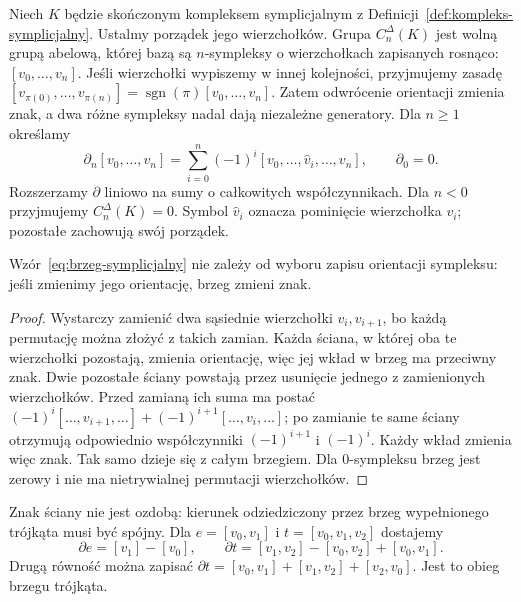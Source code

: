 \begin{definicja}
\label{def:homologia-symplicjalna}
Niech $K$ będzie skończonym kompleksem symplicjalnym
z Definicji~\ref{def:kompleks-symplicjalny}.
Ustalmy porządek jego wierzchołków. Grupa
$C_n^\Delta(K)$ jest wolną grupą abelową, której bazą są
$n$-sympleksy o wierzchołkach zapisanych rosnąco:
$[v_0,\ldots,v_n]$. Jeśli wierzchołki wypiszemy
w innej kolejności, przyjmujemy zasadę
$[v_{\pi(0)},\ldots,v_{\pi(n)}]
=\operatorname{sgn}(\pi)[v_0,\ldots,v_n]$.
Zatem odwrócenie orientacji zmienia znak, a dwa
różne sympleksy nadal dają niezależne generatory.
Dla $n\geq1$ określamy
\begin{equation}\label{eq:brzeg-symplicjalny}
 \partial_n[v_0,\ldots,v_n]
 =\sum_{i=0}^n(-1)^i
 [v_0,\ldots,\widehat v_i,\ldots,v_n],
 \qquad \partial_0=0.
\end{equation}
Rozszerzamy $\partial$ liniowo na sumy
o całkowitych współczynnikach. Dla $n<0$ przyjmujemy $C_n^\Delta(K)=0$.
Symbol $\widehat v_i$ oznacza pominięcie wierzchołka $v_i$;
pozostałe zachowują swój porządek.
\end{definicja}

\begin{stwierdzenie}
\label{prop:brzeg-orientacja}
Wzór~\eqref{eq:brzeg-symplicjalny} nie zależy od wyboru zapisu
orientacji sympleksu: jeśli zmienimy jego orientację, brzeg zmieni
znak.
\end{stwierdzenie}
\begin{proof}
Wystarczy zamienić dwa sąsiednie wierzchołki $v_i,v_{i+1}$,
bo każdą permutację można złożyć z takich zamian. Każda ściana,
w której oba te wierzchołki pozostają, zmienia orientację, więc
jej wkład w brzeg ma przeciwny znak. Dwie pozostałe ściany
powstają przez usunięcie jednego z zamienionych wierzchołków.
Przed zamianą ich suma ma postać
$(-1)^i[\ldots,v_{i+1},\ldots]
+(-1)^{i+1}[\ldots,v_i,\ldots]$;
po zamianie te same ściany otrzymują odpowiednio współczynniki
$(-1)^{i+1}$ i $(-1)^i$. Każdy wkład zmienia więc znak.
Tak samo dzieje się z całym brzegiem. Dla $0$-sympleksu brzeg
jest zerowy i nie ma nietrywialnej permutacji wierzchołków.
\end{proof}

Znak ściany nie jest ozdobą: kierunek odziedziczony
przez brzeg wypełnionego trójkąta musi być spójny.
Dla $e=[v_0,v_1]$ i $t=[v_0,v_1,v_2]$ dostajemy
\[
 \partial e=[v_1]-[v_0],\qquad
 \partial t=[v_1,v_2]-[v_0,v_2]+[v_0,v_1].
\]
Drugą równość można zapisać
$\partial t=[v_0,v_1]+[v_1,v_2]+[v_2,v_0]$.
Jest to obieg brzegu trójkąta.


